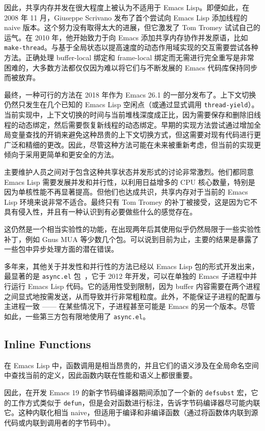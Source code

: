 \documentclass[format=acmsmall,screen]{acmart}
\begin{document}
因此，共享内存并发在很大程度上被认为不适用于 Emacs Lisp。即便如此，在 2008 年 11 月，Giuseppe Scrivano 发布了首个尝试向 Emacs Lisp 添加线程的 naive 版本。这个努力没有取得太大的进展，但它激发了 Tom Tromey 试试自己的运气。在 2010 年，他开始致力于向 Emacs 添加共享内存协作并发原语，比如 \texttt{make-thread}。与基于全局状态以提高速度的动态作用域实现的交互需要尝试各种方法。正确处理 buffer-local 绑定和 frame-local 绑定而无需进行完全重写是非常困难的，大多数方法都仅仅因为难以将它们与不断发展的 Emacs 代码库保持同步而被放弃。

最终，一种可行的方法在 2018 年作为 Emacs 26.1 的一部分发布了。上下文切换仍然只发生在几个已知的 Emacs Lisp 空闲点（或通过显式调用 \texttt{thread-yield}）。当前实现中，上下文切换的时间与当前堆栈深度成正比，因为需要保存和删除旧线程的动态绑定，然后需要恢复新线程的动态绑定。早期的实现方法尝试通过增加全局变量查找的开销来避免这种昂贵的上下文切换方式，但这需要对现有代码进行更广泛和精细的更改。因此，尽管这种方法可能在未来被重新考虑，但当前的实现更倾向于采用更简单和更安全的方法。

主要维护人员之间对于包含这种共享状态并发形式的讨论非常激烈。他们都同意 Emacs Lisp 需要发展并发和并行性，以利用日益增多的 CPU 核心数量，特别是因为单核性能不再显著提高。但他们也达成共识，共享内存对于当前的 Emacs Lisp 环境来说非常不适合。最终只有 Tom Tromey 的补丁被接受，这是因为它不具有侵入性，并且有一种认识到有必要做些什么的感觉存在。

这仍然是一个相当实验性的功能，在出现两年后其使用似乎仍然局限于一些实验性补丁，例如 Gnus MUA 等少数几个包。可以说到目前为止，主要的结果是暴露了一些包中异步处理方面的潜在错误。

多年来，其他关于并发性和并行性的方法已经以 Emacs Lisp 包的形式开发出来，最显著的是 \texttt{async.el} 包~\cite{WiegleyAsync2019}，它于 2012 年开发，可以在单独的 Emacs 子进程中并行运行 Emacs Lisp 代码。它的适用性受到限制，因为 buffer 内容需要在两个进程之间显式地按需发送，从而导致并行非常粗粒度。此外，不能保证子进程的配置与主进程一致 —— 在某些情况下，子进程甚至可能是 Emacs 的另一个版本。尽管如此，一些第三方包有限地使用了 \texttt{async.el}。

\subsection{Inline Functions}
\label{sec:inline-functions}

在 Emacs Lisp 中，函数调用是相当昂贵的，并且它们的语义涉及在全局命名空间中查找当前的定义，因此函数内联在性能和语义上都很重要。

因此，在开发 Emacs 19 的新字节码编译器期间添加了一个新的 \texttt{defsubst} 宏，它的工作方式类似于 \texttt{defun}，但是会对函数进行标注，告诉字节码编译器尽可能内联它。这种内联化相当 naive，但适用于编译和非编译函数（通过将函数体内联到源代码或内联到调用者的字节码中）。
\end{document}
